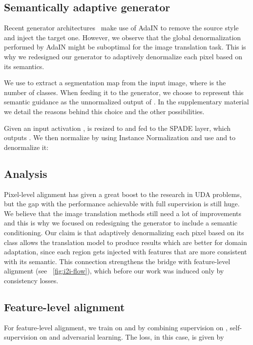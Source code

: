 \documentclass{bmvc2k}
\begin{document}
\subsection{Semantically adaptive generator}
\label{sec:sem-ad-gen}

Recent generator architectures~\cite{munit, funit, stylegan} make use of AdaIN to remove the source style and inject the target one. However, we observe that the global denormalization performed by AdaIN might be suboptimal for the image translation task. This is why we redesigned our generator to adaptively denormalize each pixel based on its semantics.

We use  to extract a segmentation map  from the input image, where  is the number of classes. When feeding it to the generator, we choose to represent this semantic guidance as the unnormalized output of . In the supplementary material we detail the reasons behind this choice and the other possibilities.

Given an input activation ,  is resized to  and fed to the SPADE layer, which outputs .  We then normalize  by using Instance Normalization and use  and  to denormalize it:



\subsection{Analysis}
Pixel-level alignment has given a great boost to the research in UDA problems, but the gap with the performance achievable with full supervision is still huge. We believe that the image translation methods still need a lot of improvements and this is why we focused on redesigning the generator to include a semantic conditioning.
Our claim is that adaptively denormalizing each pixel based on its class allows the translation model to produce results which are better for domain adaptation, since each region gets injected with features that are more consistent with its semantic. This connection strengthens the bridge with feature-level alignment (see \figurename~\ref{fig:i2i-flow}), which before our work was induced only by consistency losses.

\subsection{Feature-level alignment}
For feature-level alignment, we train  on  and  by combining supervision on , self-supervision on  and adversarial learning. The loss, in this case, is given by
\end{document}

